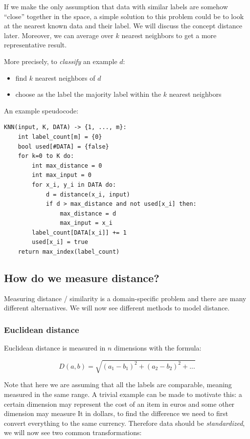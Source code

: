 \documentclass{article}
\begin{document}
If we make the only assumption that data with similar labels are somehow
``close'' together in the space, a simple solution to this problem could
be to look at the nearest known data and their label. We will discuss
the concept distance later. Moreover, we can average over \(k\) nearest
neighbors to get a more representative result.

More precisely, to \emph{classify} an example \(d\):

\begin{itemize}
\tightlist
\item
  find \(k\) nearest neighbors of \(d\)
\item
  choose as the label the majority label within the \(k\) nearest
  neighbors
\end{itemize}

An example speudocode:

\begin{verbatim}
KNN(input, K, DATA) -> {1, ..., m}:
    int label_count[m] = {0}
    bool used[#DATA] = {false}
    for k=0 to K do:
        int max_distance = 0
        int max_input = 0
        for x_i, y_i in DATA do:
            d = distance(x_i, input)
            if d > max_distance and not used[x_i] then:
                max_distance = d
                max_input = x_i
        label_count[DATA[x_i]] += 1
        used[x_i] = true
    return max_index(label_count)
\end{verbatim}

\subsection{How do we measure
distance?}\label{how-do-we-measure-distance}

Measuring distance / similarity is a domain-specific problem and there
are many different alternatives. We will now see different methods to
model distance.

\subsubsection{Euclidean distance}\label{euclidean-distance}

Euclidean distance is measured in \(n\) dimensions with the formula:

\[D(a, b) = \sqrt{(a_1 - b_1)^2 + (a_2 - b_2)^2+...}\]

Note that here we are assuming that all the labels are comparable,
meaning measured in the same range. A trivial example can be made to
motivate this: a certain dimension may represent the cost of an item in
euros and some other dimension may measure It in dollars, to find the
difference we need to first convert everything to the same currency.
Therefore data should be \emph{standardized}, we will now see two common
transformations:
\end{document}

